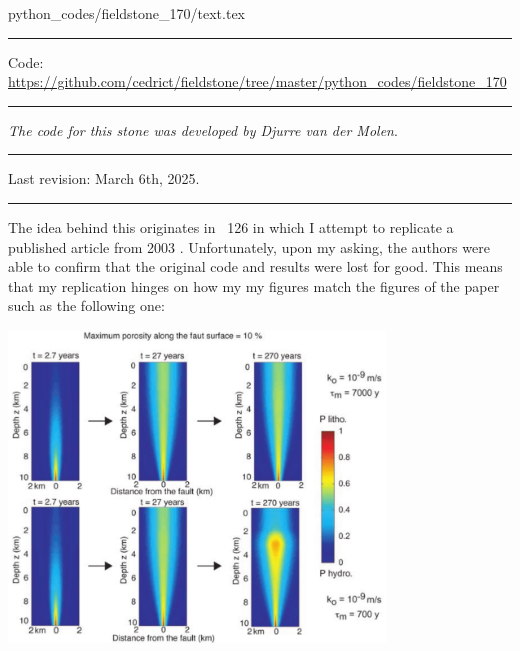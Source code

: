 
\begin{flushright} {\tiny {\color{gray} python\_codes/fieldstone\_170/text.tex}} \end{flushright}

%

\par\noindent\rule{\textwidth}{0.4pt}

\begin{center}
\inpython
{\small Code: \url{https://github.com/cedrict/fieldstone/tree/master/python_codes/fieldstone_170}}
\end{center}

\par\noindent\rule{\textwidth}{0.4pt}

{\sl The code for this stone was developed by Djurre van der Molen}. 

\par\noindent\rule{\textwidth}{0.4pt}

Last revision: March 6th, 2025.

\par\noindent\rule{\textwidth}{0.4pt}


The idea behind this \stone originates in \stone~126 in which I attempt to replicate a 
published article from 2003 \cite{grfr03}. Unfortunately, upon my asking, 
the authors were able to confirm that the original code and results were lost for good. 
This means that my replication hinges on how my my figures match 
the figures of the paper such as the following one:

\begin{center}
\includegraphics[width=10cm]{python_codes/fieldstone_170/images/grfr03}
\end{center}

